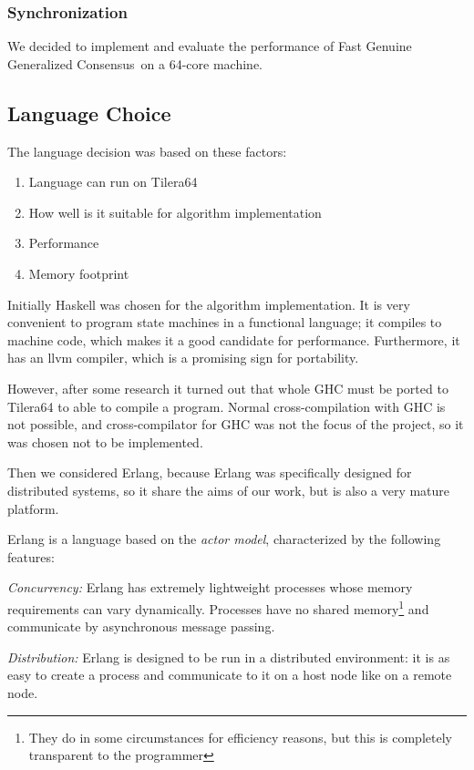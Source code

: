 \documentclass[english,11pt]{article}
\newcommand{\fggc}{Fast Genuine Generalized Consensus\ }
\begin{document}
\subsubsection{Synchronization}

We decided to implement and evaluate the performance of \fggc on a 64-core
machine.

\subsection{Language Choice}

The language decision was based on these factors:
\begin{enumerate}
    \item Language can run on Tilera64
    \item How well is it suitable for algorithm implementation
    \item Performance
    \item Memory footprint
\end{enumerate}

Initially Haskell was chosen for the algorithm implementation. It is very
convenient to program state machines in a functional language; it compiles to
machine code, which makes it a good candidate for performance. Furthermore, it
has an llvm compiler, which is a promising sign for portability.

However, after some research it turned out that whole GHC must be ported to
Tilera64 to able to compile a program. Normal cross-compilation with GHC is not
possible, and cross-compilator for GHC was not the focus of the project, so it
was chosen not to be implemented.

Then we considered Erlang, because Erlang was specifically designed for
distributed systems, so it share the aims of our work, but is also a very
mature platform.

Erlang is a language based on the  {\em actor model}, characterized by the
following features:

{\em Concurrency:} Erlang has extremely lightweight processes whose memory
requirements can vary dynamically. Processes have no shared
memory\footnote{They do in some circumstances for efficiency reasons, but this
is completely transparent to the programmer} and communicate by asynchronous
message passing.

{\em Distribution:} Erlang is designed to be run in a distributed
environment: it is as easy to create a process and communicate to
it on a host node like on a remote node.
\end{document}
